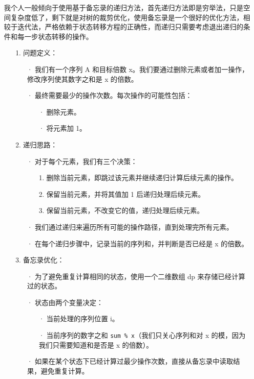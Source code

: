\documentclass[a4paper]{ctexart}
\begin{document}
我个人一般倾向于使用基于备忘录的递归方法，首先递归方法即是穷举法，只是空间复杂度低了，剩下就是对树的裁剪优化，使用备忘录是一个很好的优化方法，相较于迭代法，严格依赖于状态转移方程的正确性，而递归只需要考虑退出递归的条件和每一步状态转移的操作。

\begin{itemize}
	\item[1.] 问题定义：
	\begin{itemize}
		\item[·] 我们有一个序列 A 和目标倍数 x。我们要通过删除元素或者加一操作，修改序列使其数字之和是 x 的倍数。
		\item[·] 最终需要最少的操作次数。每次操作的可能性包括：
		
			\begin{itemize}
				\item[·] 删除元素。
				\item[·] 将元素加 1。
			\end{itemize}
			
	\end{itemize}
		

	\item[2.]递归思路：
	\begin{itemize}
	\item[·] 对于每个元素，我们有三个决策：
	
		\begin{itemize}
			\item[1.] 删除当前元素，即跳过该元素并继续递归计算后续元素的操作。
			\item[2.] 保留当前元素，并将其值加 1 后递归处理后续元素。
			\item[3.] 保留当前元素，不改变它的值，递归处理后续元素。
		\end{itemize}
		
	\item[·] 我们通过递归来遍历所有可能的操作路径，直到处理完所有元素。
	\item[·] 在每个递归步骤中，记录当前的序列和，并判断是否已经是 x 的倍数。
	\end{itemize}
	
	\item[3.]备忘录优化：
	\begin{itemize}
	\item[·] 为了避免重复计算相同的状态，使用一个二维数组 dp 来存储已经计算过的状态。
	\item[·] 状态由两个变量决定：
		\begin{itemize}
		\item[·] 当前处理的序列位置 i。
		\item[·] 当前序列的数字之和 \texttt{sum \% x}（我们只关心序列和对 x 的模，因为我们只需要知道和是否是 x 的倍数）。
		\end{itemize}
	\item[·] 如果在某个状态下已经计算过最少操作次数，直接从备忘录中读取结果，避免重复计算。
	\end{itemize}


\end{itemize}
\end{document}
